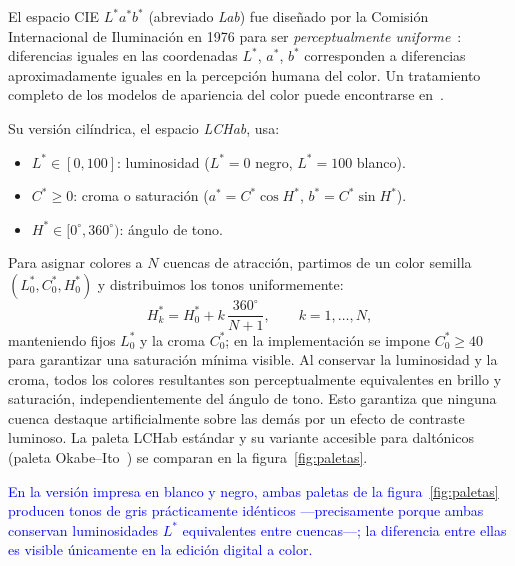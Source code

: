 \documentclass[11pt,a4paper]{article}
\theoremstyle{plain}
\theoremstyle{definition}
\theoremstyle{remark}
\begin{document}
El espacio CIE $L^*a^*b^*$ (abreviado \emph{Lab}) fue diseñado por la
Comisión Internacional de Iluminación en 1976 para ser
\emph{perceptualmente uniforme}~\cite{Schanda2007}: diferencias iguales
en las coordenadas $L^*$, $a^*$, $b^*$ corresponden a diferencias
aproximadamente iguales en la percepción humana del color.
Un tratamiento completo de los modelos de apariencia del color puede
encontrarse en~\cite{Fairchild2013}.

Su versión cilíndrica, el espacio \emph{LCHab}, usa:
\begin{itemize}
  \item $L^*\in[0,100]$: luminosidad ($L^*=0$ negro, $L^*=100$ blanco).
  \item $C^*\geq 0$: croma o saturación ($a^*=C^*\cos H^*$,\;
        $b^*=C^*\sin H^*$).
  \item $H^*\in[0^\circ,360^\circ)$: ángulo de tono.
\end{itemize}

Para asignar colores a $N$ cuencas de atracción, partimos de un color
semilla $(L_0^*, C_0^*, H_0^*)$ y distribuimos los tonos uniformemente:
\[
  H_k^* = H_0^* + k\,\frac{360^\circ}{N+1}, \qquad k=1,\ldots,N,
\]
manteniendo fijos $L_0^*$ y la croma $C_0^*$; en la implementación se impone $C_0^*\geq 40$ para garantizar una saturación mínima visible.
Al conservar la luminosidad y la croma, todos los colores resultantes
son perceptualmente equivalentes en brillo y saturación, independientemente
del ángulo de tono.
Esto garantiza que ninguna cuenca destaque artificialmente sobre las
demás por un efecto de contraste luminoso.
La paleta LCHab estándar y su variante accesible para daltónicos (paleta Okabe--Ito~\cite{OkabeIto2008}) se comparan en la figura~\ref{fig:paletas}.

\textcolor{blue}{En la versi\'{o}n impresa en blanco y negro, ambas paletas de la figura~\ref{fig:paletas} producen tonos de gris pr\'{a}cticamente id\'{e}nticos ---precisamente porque ambas conservan luminosidades $L^*$ equivalentes entre cuencas---; la diferencia entre ellas es visible \'{u}nicamente en la edici\'{o}n digital a color.}
\end{document}
